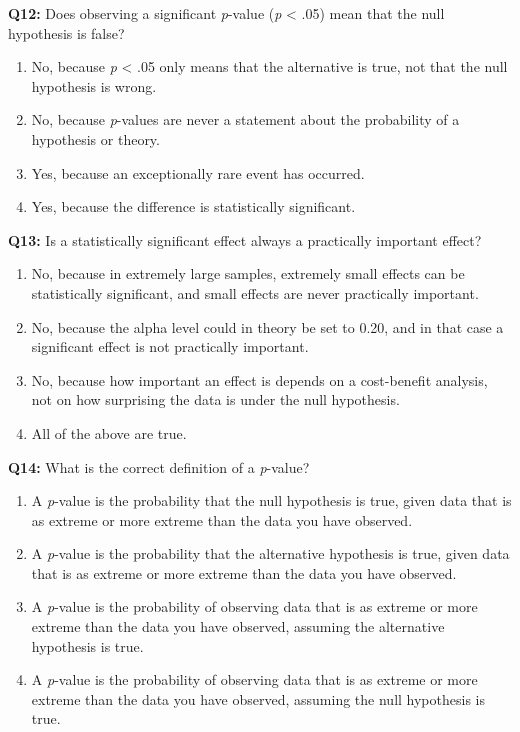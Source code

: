 \documentclass[
]{krantz}
\providecommand{\tightlist}{%
  \setlength{\itemsep}{0pt}\setlength{\parskip}{0pt}}
\begin{document}
\textbf{Q12:} Does observing a significant \emph{p}-value (\emph{p} \textless{} .05) mean that the null hypothesis is false?

\begin{enumerate}
\def\labelenumi{\Alph{enumi})}
\tightlist
\item
  No, because \emph{p} \textless{} .05 only means that the alternative is true, not that the null hypothesis is wrong.
\item
  No, because \emph{p}-values are never a statement about the probability of a hypothesis or theory.
\item
  Yes, because an exceptionally rare event has occurred.
\item
  Yes, because the difference is statistically significant.
\end{enumerate}

\textbf{Q13:} Is a statistically significant effect always a practically important
effect?

\begin{enumerate}
\def\labelenumi{\Alph{enumi})}
\tightlist
\item
  No, because in extremely large samples, extremely small effects can be statistically significant, and small effects are never practically important.
\item
  No, because the alpha level could in theory be set to 0.20, and in that case a significant effect is not practically important.
\item
  No, because how important an effect is depends on a cost-benefit analysis, not on how surprising the data is under the null hypothesis.
\item
  All of the above are true.
\end{enumerate}

\textbf{Q14:} What is the correct definition of a \emph{p}-value?

\begin{enumerate}
\def\labelenumi{\Alph{enumi})}
\tightlist
\item
  A \emph{p}-value is the probability that the null hypothesis is true, given data that is as extreme or more extreme than the data you have observed.
\item
  A \emph{p}-value is the probability that the alternative hypothesis is true, given data that is as extreme or more extreme than the data you have observed.
\item
  A \emph{p}-value is the probability of observing data that is as extreme or more extreme than the data you have observed, assuming the alternative hypothesis is true.
\item
  A \emph{p}-value is the probability of observing data that is as extreme or more extreme than the data you have observed, assuming the null hypothesis is true.
\end{enumerate}
\end{document}
